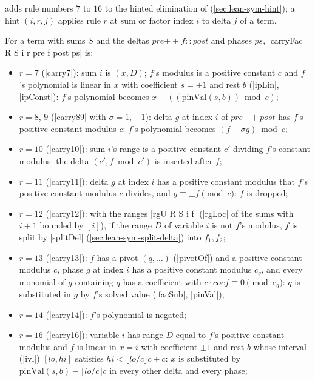  adds rule numbers $7$ to $16$ to the hinted elimination of  (\cref{sec:lean-sym-hint}); a hint $(i,r,j)$ applies rule $r$ at sum or factor index $i$ to delta $j$ of a term.

\begin{definition}\label{def:lean-sym-carryfac}
For a term with sums $S$ and the deltas $\mathit{pre}\mathbin{+\!\!+}f::\mathit{post}$ and phases $ps$, \lean|carryFac R S i r pre f post ps| is:
\begin{itemize}
\item $r=7$ (\lean|carry7|): sum $i$ is $(x,D)$; $f$'s modulus is a positive constant $c$ and $f$'s polynomial is linear in $x$ with coefficient $s=\pm1$ and rest $b$ (\lean|ipLin|, \lean|ipConst|): $f$'s polynomial becomes $x-((\mathrm{pinVal}(s,b))\bmod c)$;
\item $r=8$, $9$ (\lean|carry89| with $\sigma=1$, $-1$): delta $g$ at index $i$ of $\mathit{pre}\mathbin{+\!\!+}\mathit{post}$ has $f$'s positive constant modulus $c$: $f$'s polynomial becomes $(f+\sigma g)\bmod c$;
\item $r=10$ (\lean|carry10|): sum $i$'s range is a positive constant $c'$ dividing $f$'s constant modulus: the delta $(c',f\bmod c')$ is inserted after $f$;
\item $r=11$ (\lean|carry11|): delta $g$ at index $i$ has a positive constant modulus that $f$'s positive constant modulus $c$ divides, and $g\equiv\pm f\pmod c$: $f$ is dropped;
\item $r=12$ (\lean|carry12|): with the ranges \lean|rgU R S i f| (\lean|rgLoc| of the sums with $i+1$ bounded by $[i]$), if the range $D$ of variable $i$ is not $f$'s modulus, $f$ is split by \lean|splitDel| (\cref{sec:lean-sym-split-delta}) into $f_1,f_2$;
\item $r=13$ (\lean|carry13|): $f$ has a pivot $(q,\ldots)$ (\lean|pivotOf|) and a positive constant modulus $c$, phase $g$ at index $i$ has a positive constant modulus $c_g$, and every monomial of $g$ containing $q$ has a coefficient with $c\cdot\mathit{coef}\equiv 0\pmod{c_g}$: $q$ is substituted in $g$ by $f$'s solved value (\lean|facSub|, \lean|pinVal|);
\item $r=14$ (\lean|carry14|): $f$'s polynomial is negated;
\item $r=16$ (\lean|carry16|): variable $i$ has range $D$ equal to $f$'s positive constant modulus and $f$ is linear in $x=i$ with coefficient $\pm1$ and rest $b$ whose interval (\lean|ivl|) $[lo,hi]$ satisfies $hi<\lfloor lo/c\rfloor c+c$: $x$ is substituted by $\mathrm{pinVal}(s,b)-\lfloor lo/c\rfloor c$ in every other delta and every phase;

\end{itemize}
\end{definition}
